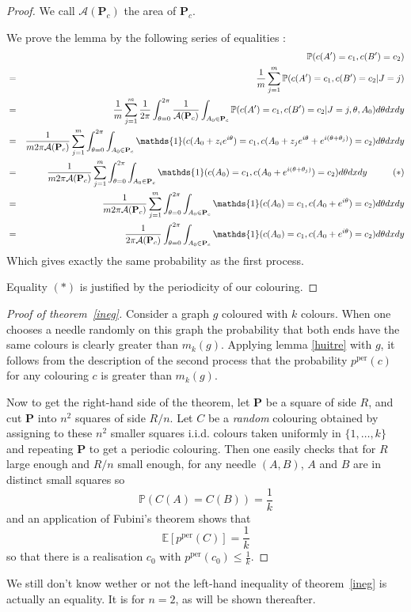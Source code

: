 \documentclass[a4paper,11pt]{article}
\theoremstyle{definition}
\theoremstyle{remark}
\renewcommand{\Pr}{\mathbb{P}}
\newcommand{\Esp}{\mathbb{E}}
\renewcommand{\P}{\mathbf{P}}
\newcommand{\pper}{p^{\mathrm{per}}}
\begin{document}
\begin{proof}
We call $\mathcal{A}(\P_c)$ the area of $\P_c$.

We prove the lemma by the following series of equalities :
\begin{eqnarray*}
& & \mathbb{P}(c(A') = c_1, c(B') = c_2) \\
  &=& \frac{1}{m}\sum_{j=1}^{m} \mathbb{P}(c(A') = c_1, c(B') = c_2 | J=j)  \\
  &=& \frac{1}{m}\sum_{j=1}^{m}  \frac{1}{2\pi}\int_{\theta =0} ^{2\pi} \frac{1}{\mathcal{A}(\P_c)}\int_{A_0 \in \P_c} \mathbb{P}(c(A') = c_1, c(B') = c_2 | J=j, \theta, A_0) d\theta dx dy \\  
  &=& \frac{1}{m 2\pi \mathcal{A}(\P_c)}\sum_{j=1}^{m}\int_{\theta =0} ^{2\pi} \int_{A_0 \in \P_c} \mathds{1}(c(A_0 + z_i e^{i\theta}) = c_1, c(A_0 +z_j e^{i\theta} + e^{i (\theta + \theta_j)}) = c_2) d\theta dx dy \\  
    &=& \frac{1}{m 2\pi \mathcal{A}(\P_c)}\sum_{j=1}^{m} \int_{\theta =0} ^{2\pi} \int_{A_0 \in \P_c} \mathds{1}(c(A_0) = c_1, c(A_0 + e^{i (\theta + \theta_j)}) = c_2 ) d\theta dx dy \hspace{1 cm} (*)\\ 
    &=& \frac{1}{m 2\pi \mathcal{A}(\P_c)}\sum_{j=1}^{m} \int_{\theta =0} ^{2\pi} \int_{A_0 \in \P_c} \mathds{1}(c(A_0) = c_1, c(A_0 + e^{i \theta}) = c_2 ) d\theta dx dy \\ 
    &=& \frac{1}{2\pi \mathcal{A}(\P_c)}\int_{\theta =0} ^{2\pi} \int_{A_0 \in \P_c} \mathds{1}(c(A_0) = c_1, c(A_0 + e^{i \theta}) = c_2 ) d\theta dx dy \\ 
\end{eqnarray*}
Which gives exactly the same probability as the first process.

Equality $(*)$ is justified by the periodicity of our colouring.
\end{proof}

\begin{proof}[Proof of theorem~\ref{ineg}]
Consider a graph $g$ coloured with $k$ colours. When one chooses a needle
randomly on this graph the probability that both ends have the same
colours is clearly greater than $m_k(g)$. Applying lemma \ref{huitre} with $g$, 
it follows from the description of the second process that the probability 
$\pper(c)$ for any colouring $c$ is greater than $m_k(g)$.

Now to get the right-hand side of the theorem, let $\P$ be a square of side $R$,
and cut $\P$ into $n^2$ squares of side $R/n$. Let $C$ be a \textit{random} 
colouring obtained by assigning to these $n^2$ smaller squares i.i.d. colours
taken uniformly in $\{1,\dots,k\}$ and repeating $\P$ to get a periodic 
colouring. Then one easily checks that for $R$ large enough and $R/n$ small
enough, for any needle $(A,B)$, $A$ and $B$ are in distinct small squares so
$$\Pr(C(A)=C(B)) = \frac1k$$
and an application of Fubini's theorem shows that
$$\Esp[\pper(C)] = \frac1k$$
so that there is a realisation $c_0$ with $\pper(c_0) \leq \frac1k$.
\end{proof}
We still don't know wether or not the left-hand inequality of theorem~\ref{ineg} is actually an equality. It is for 
$n=2$, as will be shown thereafter.
\end{document}
